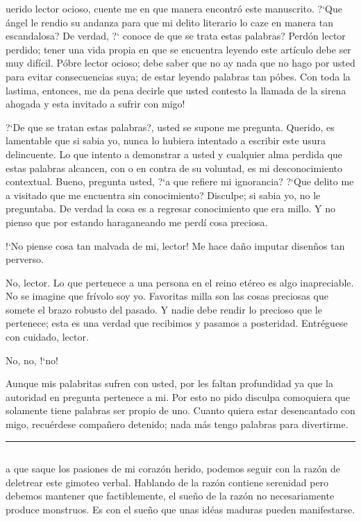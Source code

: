 \documentclass[12pt]{article}
\begin{document}
	\begin{multicols*}{2}
		uerido lector ocioso, cuente me en que manera encontr\'{o} este manuscrito. \mbox{?`}Que \'{a}ngel le rendio su andanza para que mi delito literario lo caze en manera tan escandalosa? De verdad, \mbox{?`} conoce de que se trata estas palabras? Perd\'{o}n lector perdido; tener una vida propia en que se encuentra leyendo este art\'{i}culo debe ser muy difícil. P\'{o}bre lector ocioso; debe saber que no ay nada que no hago por usted para evitar consecuencias suya; de estar leyendo palabras tan p\'{o}bes. Con toda la lastima, entonces, me da pena decirle que usted contesto la llamada de la sirena ahogada y esta invitado a sufrir con migo!
		
		\mbox{?`}De que se tratan estas palabras?, usted se supone me pregunta. Querido, es lamentable que si sabia yo, nunca lo hubiera intentado a escribir este usura delincuente. Lo que intento a demonstrar a usted y cualquier alma perdida que estas palabras alcancen, con o en contra de su voluntad, es mi desconocimiento contextual. Bueno, pregunta usted, \mbox{?`}a que refiere mi ignorancia? \mbox{?`}Que delito me a visitado que me encuentra sin conocimiento? Disculpe; si sabia yo, no le preguntaba. De verdad la cosa es a regresar conocimiento que era millo. Y no pienso que por estando haraganeando me perd\'{i} cosa preciosa.
		
		\mbox{!`}No piense cosa tan malvada de mi, lector! Me hace da\~{n}o imputar disen\~{n}os tan perverso.
		
		No, lector. Lo que pertenece a una persona en el reino etéreo es algo inapreciable. No se imagine que fr\'{i}volo soy yo. Favoritas milla son las cosas preciosas que somete el brazo robusto del pasado. Y nadie debe rendir lo precioso que le pertenece; esta es una verdad que recibimos y pasamos a posteridad. Entr\'{e}guese con cuidado, lector.
		
		No, no, \mbox{!`}no!
		
		Aunque mis palabritas sufren con usted, por les faltan profundidad ya que la autoridad en pregunta pertenece a mi.  Por esto no pido disculpa comoquiera que solamente tiene palabras ser propio de uno. Cuanto quiera estar desencantado con migo, recu\'{e}rdese compa\~{n}ero detenido; nada m\'{a}s tengo palabras para divertirme.
		
		\noindent\rule{\columnsep}{1pt}
		
		\subsection{}
		a que saque los pasiones de mi coraz\'{o}n herido, podemos seguir con la raz\'{o}n de deletrear este gimoteo verbal. Hablando de la raz\'{o}n contiene serenidad pero debemos mantener que factiblemente, el sue\~{n}o de la raz\'{o}n no necesariamente produce monstruos. Es con el sue\~{n}o que unas id\'{e}as maduras pueden manifestarse.
		

\end{multicols*}
\end{document}
